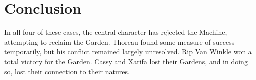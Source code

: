 \documentclass[man,12pt,natbib]{apa6}
\begin{document}
\section{Conclusion}

In all four of these cases, the central character has rejected the Machine,
attempting to reclaim the Garden. Thoreau found some measure of success
temporarily, but his conflict remained largely unresolved. Rip Van Winkle won a
total victory for the Garden. Cassy and Xarifa lost their Gardens, and in doing
so, lost their connection to their natures.


\clearpage

\end{document}
